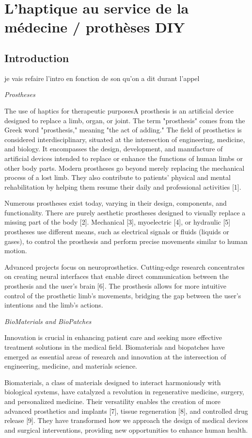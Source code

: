 \chapter{L’haptique au service de la médecine / prothèses DIY }
\section{Introduction}
je vais refaire l'intro en fonction de son qu'on a dit durant l'appel 

\textit{Prostheses}

The use of haptics for therapeutic purposesA prosthesis is an artificial device designed to replace a limb, organ, or joint. The term "prosthesis" comes from the Greek word "prosthesis," meaning "the act of adding." The field of prosthetics is considered interdisciplinary, situated at the intersection of engineering, medicine, and biology. It encompasses the design, development, and manufacture of artificial devices intended to replace or enhance the functions of human limbs or other body parts. Modern prostheses go beyond merely replacing the mechanical process of a lost limb. They also contribute to patients' physical and mental rehabilitation by helping them resume their daily and professional activities [1].

Numerous prostheses exist today, varying in their design, components, and functionality. There are purely aesthetic prostheses designed to visually replace a missing part of the body [2]. Mechanical [3], myoelectric [4], or hydraulic [5] prostheses use different means, such as electrical signals or fluids (liquids or gases), to control the prosthesis and perform precise movements similar to human motion.

Advanced projects focus on neuroprosthetics. Cutting-edge research concentrates on creating neural interfaces that enable direct communication between the prosthesis and the user's brain [6]. The prosthesis allows for more intuitive control of the prosthetic limb's movements, bridging the gap between the user's intentions and the limb's actions.

\textit{BioMaterials and BioPatches}

Innovation is crucial in enhancing patient care and seeking more effective treatment solutions in the medical field. Biomaterials and biopatches have emerged as essential areas of research and innovation at the intersection of engineering, medicine, and materials science.

Biomaterials, a class of materials designed to interact harmoniously with biological systems, have catalyzed a revolution in regenerative medicine, surgery, and personalized medicine. Their versatility enables the creation of more advanced prosthetics and implants [7], tissue regeneration [8], and controlled drug release [9]. They have transformed how we approach the design of medical devices and surgical interventions, providing new opportunities to enhance human health.

